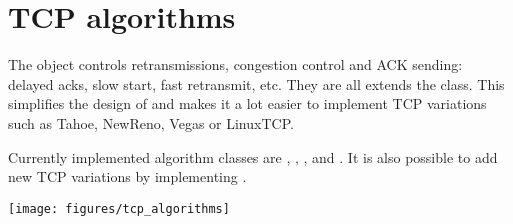 %
%
%
%
%

\section{TCP algorithms}
\label{sec:tcp_algorithms}

The  object controls
retransmissions, congestion control and ACK sending: delayed acks, slow start,
fast retransmit, etc. They are all extends the  class.
This simplifies the design of  and makes it a lot easier to
implement TCP variations such as Tahoe, NewReno, Vegas or LinuxTCP.

Currently implemented algorithm classes are ,
, , 
and . It is also possible to add new TCP variations
by implementing .

\texttt{[image: figures/tcp\_algorithms]}

